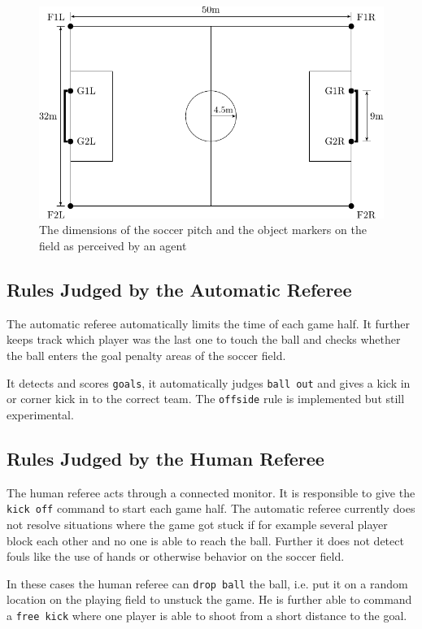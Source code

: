 \begin{figure}[htp]
  \centering
  \includegraphics[width=\textwidth]{fig/pitch}
  \caption{The dimensions of the soccer pitch and the object markers on the field as perceived by an agent}
  \label{fig:pitch}
\end{figure}

\subsection{Rules Judged by the Automatic Referee}

The automatic referee automatically limits the time of each game
half. It further keeps track which player was the last one to touch
the ball and checks whether the ball enters the goal penalty areas of
the soccer field. 

It detects and scores \texttt{goals}, it automatically judges
\texttt{ball out} and gives a kick in or corner kick in to the correct team. 
The \texttt{offside} rule is implemented but still experimental.

\subsection{Rules Judged by the Human Referee}

The human referee acts through a connected monitor. It is responsible
to give the \texttt{kick off} command to start each game half. The
automatic referee currently does not resolve situations where the game
got stuck if for example several player block each other and no one is
able to reach the ball. Further it does not detect fouls like the use
of hands or otherwise behavior on the soccer field.

In these cases the human referee can \texttt{drop ball} the ball,
i.e. put it on a random location on the playing field to unstuck the
game. He is further able to command a \texttt{free kick} where one
player is able to shoot from a short distance to the goal.



